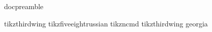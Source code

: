 \documentclass[
12pt,
a4paper,
final,
notitlepage,
oneside,
openany,
]{report}
\begin{document}
	
	{docpreamble}%
	
%	
%	
%
%	
%	
%	
%	
%	
%	
%	
%	
%	
%	
%	
%	

%
\newpage%
\pagestyle{intro}%
%
%
%
\glsaddall%
%
%
\printglossary[type=\acronymtype]
%
\newpage%
%
%
\printglossary[type=main]
%
\clearpage%
%	
%	
%	
%	


\pagestyle{annexes}%

\begin{appendices}%

\newpage

{tikzthirdwing}
\newpage
{tikzfiveeightrussian}
\newpage
{tikzncmd}
\newpage
{tikzthirdwing}
\newpage
{georgia}
\newpage



\end{appendices}%
\end{document}
